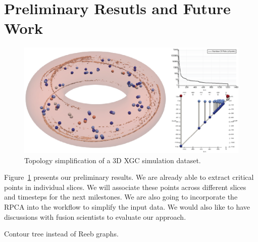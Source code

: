 \section{Preliminary Resutls and Future Work}

\begin{figure}[!h]
  \centering
  \includegraphics[width=\linewidth]{Figs/simplification3D}
  \caption{Topology simplification of a 3D XGC simulation dataset.}
  \label{fig:results}
\end{figure}



Figure~\ref{fig:results} presents our preliminary results.  We are already able to extract critical points in individual slices.  We will associate these points across different slices and timesteps for the next milestones.  We are also going to incorporate the RPCA into the workflow to simplify the input data.  We would also like to have discussions with fusion scientists to evaluate our approach.  


Contour tree instead of Reeb graphs.  